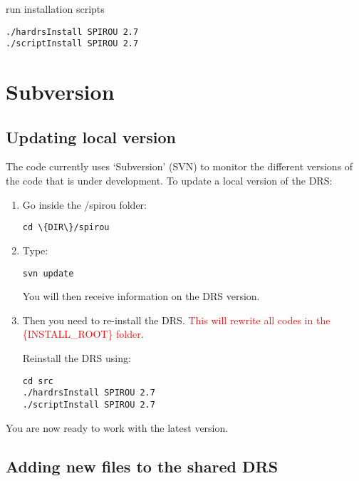run installation scripts

\begin{lstlisting}[style=bashstyle]
./hardrsInstall SPIROU 2.7
./scriptInstall SPIROU 2.7
\end{lstlisting}

\section{Subversion}
\label{section:how_to_update}

\subsection{Updating local version}
The code currently uses `Subversion' (SVN) to monitor the different versions of the code that is under development. To update a local version of the DRS:

\begin{enumerate}
\item Go inside the /spirou folder:
\begin{lstlisting}[style=bashstyle]
cd \{DIR\}/spirou
\end{lstlisting}

\item Type:
\begin{lstlisting}[style=bashstyle]
svn update
\end{lstlisting}

You will then receive information on the DRS version.

\item Then you need to re-install the DRS. \textcolor{red}{This will rewrite all codes in the \{INSTALL\_ROOT\} folder}.

Reinstall the DRS using:
\begin{lstlisting}[style=bashstyle]
cd src
./hardrsInstall SPIROU 2.7
./scriptInstall SPIROU 2.7
\end{lstlisting}

\end{enumerate}

You are now ready to work with the latest version.


\subsection{Adding new files to the shared DRS}
\label{section:how_to_add}

